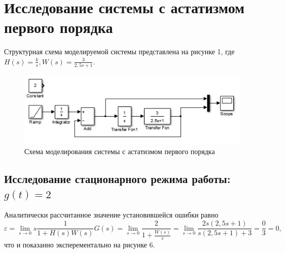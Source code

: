 \documentclass[a4paper, 11pt, russian]{article}
\begin{document}
    \section{Исследование системы с астатизмом первого порядка}
    Структурная схема моделируемой системы представлена на рисунке 1, где $H(s) = \displaystyle{\frac{k}{s}}, W(s) = \displaystyle{\frac{3}{2,5s + 1}}$.
    
    \begin{figure}[h!]
        \centering
        \includegraphics{1astScheme.PNG}
        \caption{Схема моделирования системы с астатизмом первого порядка}
    \end{figure}
    \subsection{Исследование стационарного режима работы: $g(t) = 2$}
    Аналитически рассчитанное значение установившейся ошибки равно $$\varepsilon = \lim_{s\to0} s\frac{1}{1 + H(s)W(s)}G(s) = \lim_{s\to0} \frac{2}{1 + \frac{W(s)}{s}} = \lim_{s\to0} \frac{2s(2,5s + 1)}{s(2,5s + 1) + 3} = \frac{0}{3} = 0,$$ что и показанно эксперементально на рисунке 6.
    
\end{document}
